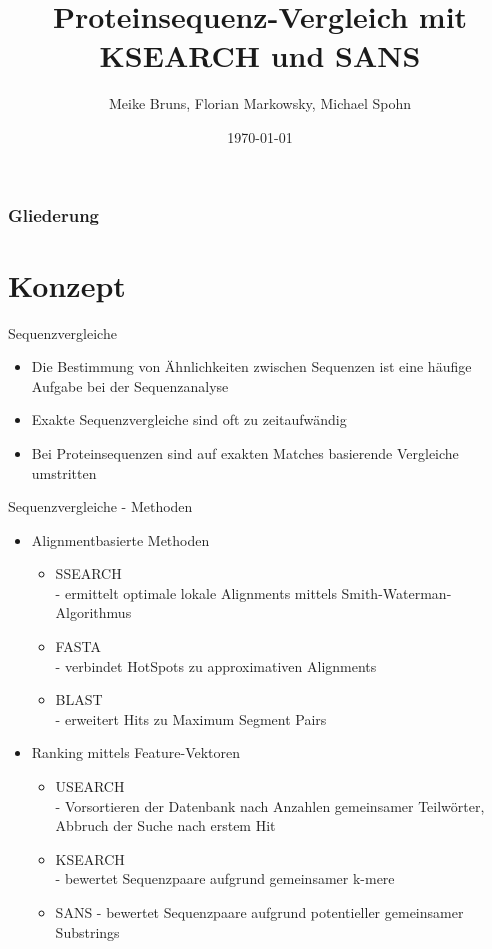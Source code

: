 \documentclass[aspectratio=1610]{beamer}
\author{Meike Bruns, Florian Markowsky, Michael Spohn}
\title{Proteinsequenz-Vergleich mit KSEARCH und SANS}
\date{\today}
\begin{document}

\maketitle

\begin{frame}
	\frametitle{Gliederung}
	\tableofcontents
\end{frame}

\section{Konzept}

\begin{frame}{Sequenzvergleiche}
  \begin{itemize}
    \item Die Bestimmung von Ähnlichkeiten zwischen Sequenzen ist eine häufige Aufgabe bei der Sequenzanalyse 
    \item Exakte Sequenzvergleiche sind oft zu zeitaufwändig
    \item Bei Proteinsequenzen sind auf exakten Matches basierende Vergleiche umstritten
  \end{itemize}
\end{frame}

\begin{frame}{Sequenzvergleiche - Methoden}
  \begin{itemize}
    \item Alignmentbasierte Methoden
      \begin{itemize}
        \item SSEARCH\\
              - ermittelt optimale lokale Alignments mittels Smith-Waterman-Algorithmus
        \item FASTA\\
              - verbindet HotSpots zu approximativen Alignments
        \item BLAST\\
              - erweitert Hits zu Maximum Segment Pairs
      \end{itemize}
    \item Ranking mittels Feature-Vektoren
      \begin{itemize}
        \item USEARCH\\
              - Vorsortieren der Datenbank nach Anzahlen gemeinsamer Teilwörter, Abbruch der Suche nach erstem Hit
        \item KSEARCH\\
              - bewertet Sequenzpaare aufgrund gemeinsamer k-mere
        \item SANS
              - bewertet Sequenzpaare aufgrund potentieller gemeinsamer Substrings
      \end{itemize}
  \end{itemize}
\end{frame}
\end{document}
